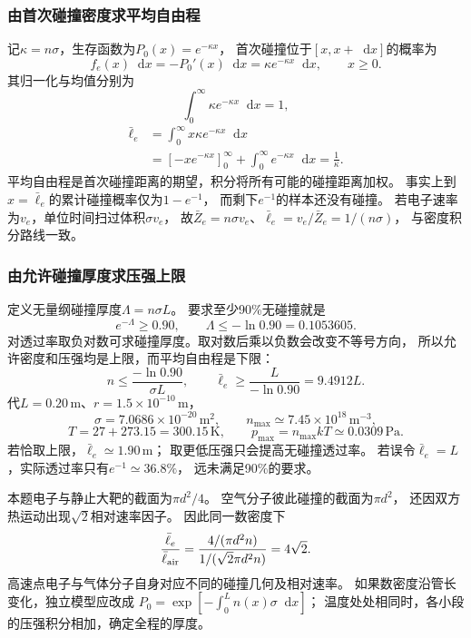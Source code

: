 \documentclass[UTF8,fontset=fandol,a4paper,11pt]{ctexart}
\newcommand{\dd}{\mathop{}\!\mathrm{d}}
\begin{document}
\subsubsection*{由首次碰撞密度求平均自由程}
记$\kappa=n\sigma$，生存函数为$P_0(x)=e^{-\kappa x}$，
首次碰撞位于$[x,x+\dd x]$的概率为
\[
f_e(x)\dd x=-P_0'(x)\dd x
=\kappa e^{-\kappa x}\dd x,\qquad x\ge0.
\]
其归一化与均值分别为
\[
\int_0^\infty\kappa e^{-\kappa x}\dd x=1,
\]
\[
\begin{aligned}
\bar\ell_e
&=\int_0^\infty x\kappa e^{-\kappa x}\dd x\\
&=[-xe^{-\kappa x}]_0^\infty+
\int_0^\infty e^{-\kappa x}\dd x=\frac1\kappa.
\end{aligned}
\]
平均自由程是首次碰撞距离的期望，积分将所有可能的碰撞距离加权。
事实上到$x=\bar\ell_e$的累计碰撞概率仅为$1-e^{-1}$，
而剩下$e^{-1}$的样本还没有碰撞。
若电子速率为$v_e$，单位时间扫过体积$\sigma v_e$，
故$\bar Z_e=n\sigma v_e$、$\bar\ell_e=v_e/\bar Z_e=1/(n\sigma)$，
与密度积分路线一致。

\subsubsection*{由允许碰撞厚度求压强上限}
定义无量纲碰撞厚度$\Lambda=n\sigma L$。
要求至少90\%无碰撞就是
\[
e^{-\Lambda}\ge0.90,\qquad
\Lambda\le-\ln0.90=0.1053605.
\]
对透过率取负对数可求碰撞厚度。取对数后乘以负数会改变不等号方向，
所以允许密度和压强均是上限，而平均自由程是下限：
\[
n\le\frac{-\ln0.90}{\sigma L},\qquad
\bar\ell_e\ge\frac{L}{-\ln0.90}=9.4912L.
\]
代$L=0.20\,\mathrm m$、$r=1.5\times10^{-10}\,\mathrm m$，
\[
\sigma=7.0686\times10^{-20}\,\mathrm{m^2},\qquad
n_{\max}\simeq7.45\times10^{18}\,\mathrm{m^{-3}},
\]
\[
T=27+273.15=300.15\,\mathrm K,\qquad
p_{\max}=n_{\max}kT\simeq0.0309\,\mathrm{Pa}.
\]
若恰取上限，$\bar\ell_e\simeq1.90\,\mathrm m$；
取更低压强只会提高无碰撞透过率。
若误令$\bar\ell_e=L$，实际透过率只有$e^{-1}\simeq36.8\%$，
远未满足90\%的要求。

本题电子与静止大靶的截面为$\pi d^2/4$。
空气分子彼此碰撞的截面为$\pi d^2$，
还因双方热运动出现$\sqrt2$相对速率因子。
因此同一数密度下
\[
\frac{\bar\ell_e}{\bar\ell_{\rm air}}
=\frac{4/(\pi d^2n)}{1/(\sqrt2\pi d^2n)}
=4\sqrt2.
\]
高速点电子与气体分子自身对应不同的碰撞几何及相对速率。
如果数密度沿管长变化，独立模型应改成
$P_0=\exp[-\int_0^L n(x)\sigma\dd x]$；
温度处处相同时，各小段的压强积分相加，确定全程的厚度。



\end{document}
